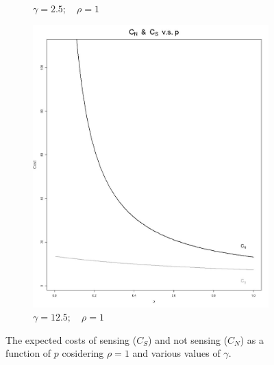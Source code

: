 \documentclass[11pt]{article}
\numberwithin{equation}{section}
\begin{document}
\begin{figure}[h!]
\begin{subfigure}[b]{0.49\textwidth}
		\caption{$\gamma=2.5;\quad\rho=1$}
		\label{cost_vs_p_2_5_1}
	\end{subfigure}
	\begin{subfigure}[b]{0.49\textwidth}
	\includegraphics[width=\textwidth]{plots/cost_vs_p_12_5_1.png}
		\caption{$\gamma=12.5;\quad\rho=1$}
		\label{cost_vs_p_12_5_1}
	\end{subfigure}
	\caption{The expected costs of sensing ($C_S$) and not sensing ($C_N$) as a function of $p$ cosidering $\rho=1$ and various values of $\gamma$.}\label{CostVsP rho=1}
\end{figure}
\end{document}
